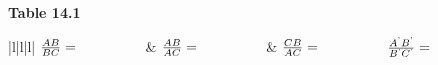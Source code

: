 {{    \begin{center}{\small\bfseries Table 14.1}\end{center}
          }{ %
        \begin{center}
      \label{m39405*id78604}
    \noindent
      \tablelasttail{}
      \begin{xtabular}[t]{|l|l|l|}\hline
     \tabularnewline{}
                \begin{math}\frac{AB}{BC}=\phantom{\rule{42.67912pt}{0ex}}\end{math}
               &
                \begin{math}\frac{AB}{AC}=\phantom{\rule{42.67912pt}{0ex}}\end{math}
               &
                \begin{math}\frac{CB}{AC}=\phantom{\rule{42.67912pt}{0ex}}\end{math}
     \tabularnewline{}
                \begin{math}\frac{{A}^{\text{'}}{B}^{\text{'}}}{{B}^{\text{'}}{C}^{\text{'}}}=\phantom{\rule{42.67912pt}{0ex}}\end{math}

\end{xtabular}
\end{center}}}
